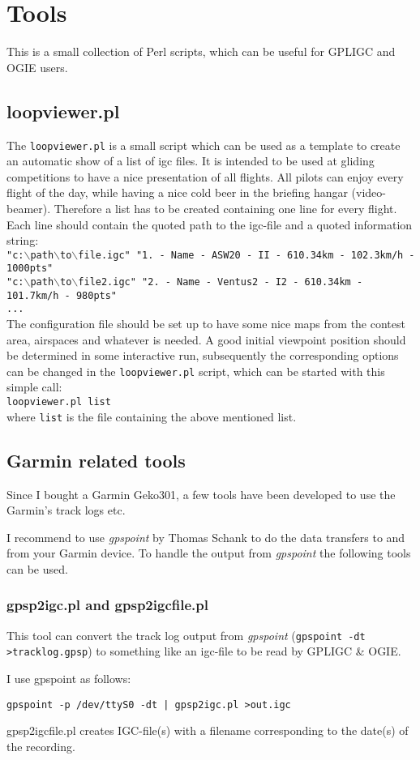 \section{Tools}

This is a small collection of Perl scripts, which can be useful for GPLIGC and OGIE users.

\subsection{loopviewer.pl}
The \texttt{loopviewer.pl} is a small script which can be used as a template to create an automatic show of a list of igc files.
It is intended to be used at gliding competitions to have a nice presentation of all flights. All pilots can enjoy every flight of the day, while having a nice cold beer in the briefing hangar (video-beamer).
Therefore a list has to be created containing one line for every flight. Each line should contain the quoted path to the igc-file and a quoted information string: \\
\texttt{"c:$\backslash$path$\backslash$to$\backslash$file.igc"   "1. - Name - ASW20 - II - 610.34km - 102.3km/h - 1000pts"} \\
\texttt{"c:$\backslash$path$\backslash$to$\backslash$file2.igc"  "2. - Name - Ventus2 - I2 - 610.34km - 101.7km/h - 980pts"} \\
\texttt{...} \\
The configuration file should be set up to have some nice maps from the contest area, airspaces and whatever is needed. A good initial viewpoint position should be determined in some interactive run, subsequently the corresponding options can be changed in the \texttt{loopviewer.pl} script, which can be started with this simple call: \\
\texttt{loopviewer.pl  list} \\
where \texttt{list} is the file containing the above mentioned list.


\subsection{Garmin related tools}

Since I bought a Garmin Geko301, a few tools have been developed to use the Garmin's track logs etc.

I recommend to use \emph{gpspoint}  by Thomas Schank to do the data transfers to and from your Garmin device.
To handle the output from \emph{gpspoint} the following tools can be used.

\subsubsection{gpsp2igc.pl and gpsp2igcfile.pl}
\label{gpsp2igc}
This tool can convert the track log output from \emph{gpspoint} (\texttt{gpspoint -dt >tracklog.gpsp})
to something like an igc-file to be read by GPLIGC \& OGIE.

I use gpspoint as follows:

\texttt{gpspoint -p /dev/ttyS0 -dt | gpsp2igc.pl >out.igc}

gpsp2igcfile.pl creates IGC-file(s) with a filename corresponding to the date(s) of the recording.
